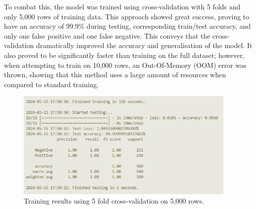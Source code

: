     To combat this, the model was trained using cross-validation with 5 folds and only 5,000 rows of training data. This approach showed great success, proving to have an accuracy of 99.9\% during testing, corresponding train/test accuracy, and only one false positive and one false negative. This conveys that the cross-validation dramatically improved the accuracy and generalisation of the model. It also proved to be significantly faster than training on the full dataset; however, when attempting to train on 10,000 rows, an Out-Of-Memory (OOM) error was thrown, showing that this method uses a large amount of resources when compared to standard training.

    \FloatBarrier
    \begin{figure}[h]
        \centering
        \includegraphics[width=0.95\textwidth]{figures/cross_validation_5000_overall.png}
        \caption{Training results using 5 fold cross-validation on 5,000 rows.}
    \end{figure}

